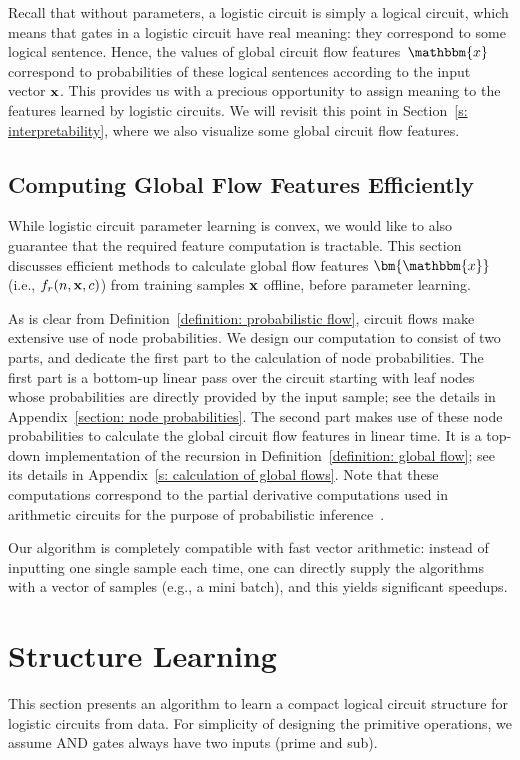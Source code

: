 \documentclass[letterpaper]{article} %
\newcommand{\sample}{{\bf x}}
\begin{document}
Recall that without parameters, a logistic circuit is simply a logical circuit, which means that gates in a logistic circuit have real meaning: they correspond to some logical sentence. Hence, the values of global circuit flow features~$\mathbbm{x}$ correspond to probabilities of these logical sentences according to the input vector $\sample$. This provides us with a precious opportunity to assign meaning to the features learned by logistic circuits. We will revisit this point in Section~\ref{s: interpretability}, where we also visualize some global circuit flow features.

\subsection{Computing Global Flow Features Efficiently}
\label{section: computing flows}
While logistic circuit parameter learning is convex, we would like to also guarantee that the required feature computation is tractable. This section discusses efficient methods to calculate global flow features $\bm{\mathbbm{x}}$ (i.e., $f_r(n, \sample, c)$) from training samples $\bf x$ offline, before parameter learning.

As is clear from Definition~\ref{definition: probabilistic flow}, circuit flows make extensive use of node probabilities.
We design our computation to consist of two parts, and dedicate the first part to the calculation of node probabilities. The first part is a bottom-up linear pass over the circuit starting with leaf nodes whose probabilities are directly provided by the input sample; see the details in Appendix~\ref{section: node probabilities}.
The second part makes use of these node probabilities to calculate the global circuit flow features in linear time.
It is a top-down implementation of the recursion in Definition~\ref{definition: global flow}; see its details in Appendix~\ref{s: calculation of global flows}.
Note that these computations correspond to the partial derivative computations used in arithmetic circuits for the purpose of probabilistic inference~\cite{DarwicheJACM}.

Our algorithm is completely compatible with fast vector arithmetic: instead of inputting one single sample each time,  one can directly supply the algorithms with a vector of samples (e.g., a mini batch), and this yields significant speedups.


\section{Structure Learning} \label{s:structurelearning}
This section presents an algorithm to learn a compact logical circuit structure for logistic circuits from data.
For simplicity of designing the primitive operations, we assume AND gates always have two inputs (prime and sub).
\end{document}
